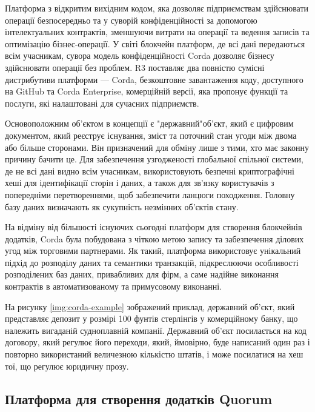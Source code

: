 \documentclass{lib/styles/default-style}
\begin{document}
    Платформа з відкритим вихідним кодом, яка дозволяє підприємствам здійснювати операції безпосередньо
    та у суворій конфіденційності за допомогою інтелектуальних контрактів, зменшуючи витрати на операції
    та ведення записів та оптимізацію бізнес-операції. У світі блокчейн платформ, де всі дані передаються
    всім учасникам, сувора модель конфіденційності Corda дозволяє бізнесу здійснювати операції без проблем.
    R3 поставляє два повністю сумісні дистрибутиви платформи --- Corda, безкоштовне завантаження коду,
    доступного на GitHub та Corda Enterprise, комерційній версії, яка пропонує функції та послуги, які налаштовані
    для сучасних підприємств.

    Основоположним об'єктом в концепції є "державний"\enspace об'єкт, який є цифровим документом,
    який реєструє існування, зміст та поточний стан угоди між двома або більше сторонами.
    Він призначений для обміну лише з тими, хто має законну причину бачити це.
    Для забезпечення узгодженості глобальної спільної системи, де не всі дані видно всім учасникам,
    використовують безпечні криптографічні хеші для ідентифікації сторін і даних, а також для зв’язку користувачів
    з попередніми перетвореннями,
    щоб забезпечити ланцюги походження. Головну базу даних визначають як сукупність незмінних об'єктів стану.

    На відміну від більшості існуючих сьогодні платформ для створення блокчейнів додатків, Corda була побудована з чіткою метою
    запису та забезпечення ділових угод між торговими партнерами.
    Як такий, платформа використовує унікальний підхід до розподілу даних та семантики транзакцій,
    підкреслюючи особливості розподілених баз даних, привабливих для фірм, а саме надійне виконання контрактів в автоматизованому
    та примусовому виконанні.

    На рисунку \ref{img:corda-example} зображений приклад, державний об'єкт,
    який представляє депозит у розмірі 100 фунтів стерлінгів у комерційному банку,
    що належить вигаданій судноплавній компанії.
    Державний об'єкт посилається на код договору,
    який регулює його переходи, який, ймовірно,
    буде написаний один раз і повторно використаний величезною кількістю штатів, і може посилатися на хеш тої, що регулює юридичну прозу.



\subsection{Платформа для створення додатків Quorum}
\end{document}
